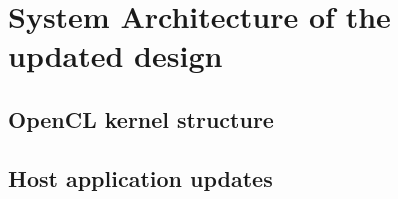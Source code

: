 \chapter{System Architecture of the updated design}
\label{cha:sys_arch}

\section{OpenCL kernel structure}

\section{Host application updates}